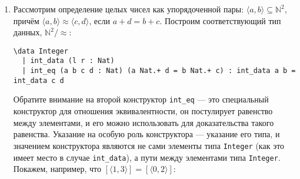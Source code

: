 \documentclass[10pt,a4paper,oneside]{article}
\begin{document}
\begin{enumerate}
\begin{verbatim}
\data Div3 (x : Nat)
  | remainder-zero (Exists (p : Nat) (p Nat.* 3 = x))
  | remainder-one (Exists (p : Nat) (p Nat.* 3 Nat.+ 1 = x))
  | remainder-two (Exists (p : Nat) (p Nat.* 3 Nat.+ 2 = x))
  \where \use \level levelProp {x : Nat} (a b : Div3 x) : a = b => {?}
\end{verbatim}

\begin{enumerate}
\item Замените \verb!{?}! в тексте выше на корректное доказательство.
\item Определите функцию, которая бы по $x$ и значению $\exists p q.3 \cdot p + q = x \with 0 \le q < 3$ возвращала бы \verb!Div3 x!
(понятно, можно разделить $x$ на 3, но нам уже результат деления дали вторым аргументом --- задача в том, чтобы им воспользоваться).
\item Постройте аналогичный тип \verb!Prime x! для простых чисел --- с тремя вариантами \verb!less-than-two!, \verb!is-prime!, 
\verb!is-composite! --- и определите функцию, строящую по числу значение данного типа.
\item Покажите, что в типе \verb!Prime (x*x + 2*x + 1)! всегда (кроме граничных случаев) обитает вариант \verb!is-composite!.
\item Покажите, что в типе 
\begin{verbatim}
\data SuperDec (P : \Prop)
| sure P
| nope (P -> Empty)
| neither ((P || (P -> Empty)) -> Empty)
\where \use \level superDecProp {P : \Prop} (a b : SuperDec P): a = b => {?}
\end{verbatim}
вариант \verb!neither! невозможен (также, заполните пропущенное доказательство \verb!superDecProp!).
\end{enumerate}

\item Рассмотрим определение целых чисел как упорядоченной пары: $\langle a,b\rangle \subseteq \mathbb{N}^2$,
причём $\langle a,b\rangle \approx \langle c,d\rangle$, если $a + d = b + c$. Построим соответствующий тип
данных, $\mathbb{N}^2/\approx$:

\begin{verbatim}
\data Integer
  | int_data (l r : Nat)
  | int_eq (a b c d : Nat) (a Nat.+ d = b Nat.+ c) : int_data a b = int_data c d
\end{verbatim}

Обратите внимание на второй конструктор \verb!int_eq! --- это специальный конструктор для отношения эквивалентности,
он постулирует равенство между элементами, и его можно использовать для доказательства такого равенства.
Указание на особую роль конструктора --- указание его типа, и значением конструктора являются не сами элементы типа
\verb!Integer! (как это имеет место в случае \verb!int_data!), а пути между элементами типа \verb!Integer!.
Покажем, например, что $[\langle 1,3\rangle] = [\langle 0,2\rangle]$:


\end{enumerate}
\end{document}

